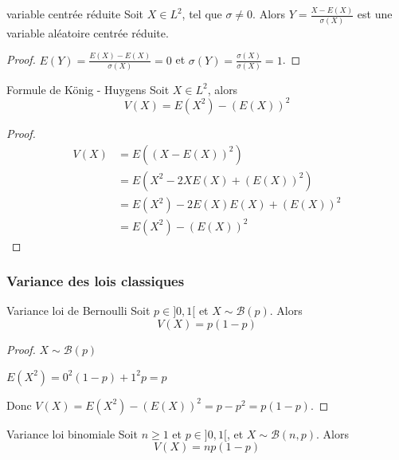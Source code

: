 \begin{corollaire}{variable centrée réduite}{}
    Soit $X \in L^2$, tel que $\sigma \neq 0$. Alors 
    $Y = \frac{X - E(X)}{\sigma(X)}$ est une variable aléatoire centrée réduite.
\end{corollaire}

\begin{proof}
    $E(Y) = \frac{E(X) - E(X)}{\sigma(X)} = 0$ et 
    $\sigma(Y) = \frac{\sigma(X)}{\sigma(X)} = 1$.
\end{proof}

\begin{proposition}{Formule de König - Huygens}{}
    Soit $X \in L^2$, alors
    $$ V(X) = E(X^2) - (E(X))^2 $$
\end{proposition}

\begin{proof}
    \begin{align}
        V(X) & = E\left( (X - E(X))^2 \right) \\
        & = E(X^2 - 2 X E(X) + (E(X))^2) \\
        & = E(X^2) - 2 E(X) E(X) + (E(X))^2 \\
        & = E(X^2) - (E(X))^2
    \end{align}
\end{proof}

\subsubsection{Variance des lois classiques }

\begin{proposition}{Variance loi de Bernoulli}{}
    Soit $p \in ]0, 1[$ et $X \sim \mathcal B(p)$. Alors 
    $$ V(X) = p(1 - p) $$
\end{proposition}

\begin{proof}
    $X \sim \mathcal B(p)$ 

    $E(X^2) = 0^2 (1 - p) + 1^2 p = p$

    Donc $V(X) = E(X^2) - (E(X))^2 = p - p^2 = p(1 - p)$.
\end{proof}


\begin{proposition}{Variance loi binomiale}{}
    Soit $n \geqslant 1$ et $p \in ]0, 1[$, et $X \sim \mathcal B(n, p)$. Alors 
    $$ V(X) = n p (1 - p) $$
\end{proposition}


